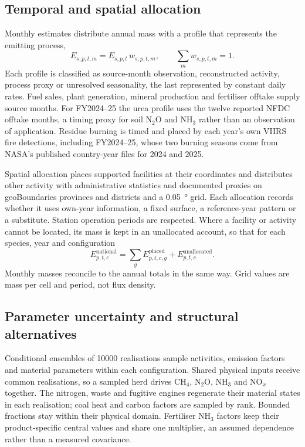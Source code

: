 \documentclass[essd,manuscript]{copernicus}
\begin{document}
\subsection{Temporal and spatial allocation}
\label{sec:monthly}
\label{sec:cube}
Monthly estimates distribute annual mass with a profile that represents the emitting process,
\begin{equation}
 E_{s,p,t,m}=E_{s,p,t}\,w_{s,p,t,m},\qquad \textstyle\sum_m w_{s,p,t,m}=1.
 \label{eq:monthly}
\end{equation}
Each profile is classified as source-month observation, reconstructed activity, process proxy or unresolved seasonality, the last represented by constant daily rates. Fuel sales, plant generation, mineral production and fertiliser offtake supply source months. For FY2024--25 the urea profile uses the twelve reported NFDC offtake months, a timing proxy for soil N$_2$O and NH$_3$ rather than an observation of application. Residue burning is timed and placed by each year's own VIIRS fire detections, including FY2024--25, whose two burning seasons come from NASA's published country-year files for 2024 and 2025.

Spatial allocation places supported facilities at their coordinates and distributes other activity with administrative statistics and documented proxies on geoBoundaries provinces and districts \citep{Runfola2020} and a \SI{0.05}{\degree} grid. Each allocation records whether it uses own-year information, a fixed surface, a reference-year pattern or a substitute. Station operation periods are respected. Where a facility or activity cannot be located, its mass is kept in an unallocated account, so that for each species, year and configuration
\begin{equation}
 E^{\mathrm{national}}_{p,t,c}=\textstyle\sum_g E^{\mathrm{placed}}_{p,t,c,g}+E^{\mathrm{unallocated}}_{p,t,c}.
 \label{eq:spatial}
\end{equation}
Monthly masses reconcile to the annual totals in the same way. Grid values are mass per cell and period, not flux density.

\subsection{Parameter uncertainty and structural alternatives}
\label{sec:uncertainty}
Conditional ensembles of \num{10000} realisations sample activities, emission factors and material parameters within each configuration. Shared physical inputs receive common realisations, so a sampled herd drives CH$_4$, N$_2$O, NH$_3$ and NO$_x$ together. The nitrogen, waste and fugitive engines regenerate their material states in each realisation; coal heat and carbon factors are sampled by rank. Bounded fractions stay within their physical domain. Fertiliser NH$_3$ factors keep their product-specific central values and share one multiplier, an assumed dependence rather than a measured covariance.
\end{document}
